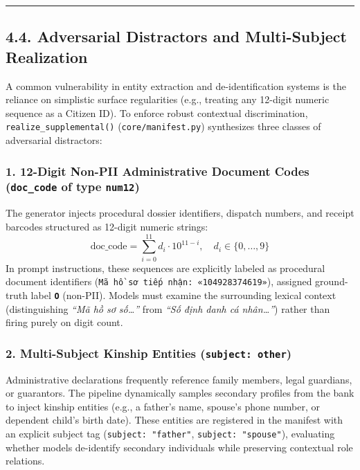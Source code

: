 \documentclass[
]{article}
\begin{document}
\begin{center}\rule{0.5\linewidth}{0.5pt}\end{center}

\subsection{4.4. Adversarial Distractors and Multi-Subject
Realization}\label{adversarial-distractors-and-multi-subject-realization}

A common vulnerability in entity extraction and de-identification
systems is the reliance on simplistic surface regularities (e.g.,
treating any 12-digit numeric sequence as a Citizen ID). To enforce
robust contextual discrimination, \texttt{realize\_supplemental()}
(\texttt{core/manifest.py}) synthesizes three classes of adversarial
distractors:

\subsubsection{\texorpdfstring{1. 12-Digit Non-PII Administrative
Document Codes (\texttt{doc\_code} of type
\texttt{num12})}{1. 12-Digit Non-PII Administrative Document Codes (doc\_code of type num12)}}\label{digit-non-pii-administrative-document-codes-doc_code-of-type-num12}

The generator injects procedural dossier identifiers, dispatch numbers,
and receipt barcodes structured as 12-digit numeric strings:
\[\text{doc\_code} = \sum_{i=0}^{11} d_i \cdot 10^{11-i}, \quad d_i \in \{0, \dots, 9\}\]
In prompt instructions, these sequences are explicitly labeled as
procedural document identifiers
(\texttt{Mã\ hồ\ sơ\ tiếp\ nhận:\ «104928374619»}), assigned
ground-truth label \textbf{\texttt{O}} (non-PII). Models must examine
the surrounding lexical context (distinguishing \emph{``Mã hồ sơ
số\ldots{}''} from \emph{``Số định danh cá nhân\ldots{}''}) rather than
firing purely on digit count.

\subsubsection{\texorpdfstring{2. Multi-Subject Kinship Entities
(\texttt{subject:\ other})}{2. Multi-Subject Kinship Entities (subject: other)}}\label{multi-subject-kinship-entities-subject-other}

Administrative declarations frequently reference family members, legal
guardians, or guarantors. The pipeline dynamically samples secondary
profiles from the bank to inject kinship entities (e.g., a father's
name, spouse's phone number, or dependent child's birth date). These
entities are registered in the manifest with an explicit subject tag
(\texttt{subject:\ "father"}, \texttt{subject:\ "spouse"}), evaluating
whether models de-identify secondary individuals while preserving
contextual role relations.
\end{document}
